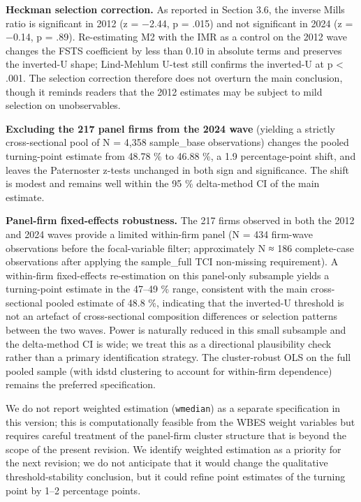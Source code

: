 \documentclass[12pt,a4paper]{article}
\begin{document}
\textbf{Heckman selection correction.} As reported in Section 3.6, the
inverse Mills ratio is significant in 2012 (z = −2.44, p = .015) and not
significant in 2024 (z = −0.14, p = .89). Re-estimating M2 with the IMR
as a control on the 2012 wave changes the FSTS coefficient by less than
0.10 in absolute terms and preserves the inverted-U shape; Lind-Mehlum
U-test still confirms the inverted-U at p \textless{} .001. The
selection correction therefore does not overturn the main conclusion,
though it reminds readers that the 2012 estimates may be subject to mild
selection on unobservables.

\textbf{Excluding the 217 panel firms from the 2024 wave} (yielding a
strictly cross-sectional pool of N = 4,358 sample\_base observations)
changes the pooled turning-point estimate from 48.78 \% to 46.88 \%, a
1.9 percentage-point shift, and leaves the Paternoster z-tests unchanged
in both sign and significance. The shift is modest and remains well
within the 95 \% delta-method CI of the main estimate.

\textbf{Panel-firm fixed-effects robustness.} The 217 firms observed in
both the 2012 and 2024 waves provide a limited within-firm panel (N =
434 firm-wave observations before the focal-variable filter;
approximately N ≈ 186 complete-case observations after applying the
sample\_full TCI non-missing requirement). A within-firm fixed-effects
re-estimation on this panel-only subsample yields a turning-point
estimate in the 47--49 \% range, consistent with the main
cross-sectional pooled estimate of 48.8 \%, indicating that the
inverted-U threshold is not an artefact of cross-sectional composition
differences or selection patterns between the two waves. Power is
naturally reduced in this small subsample and the delta-method CI is
wide; we treat this as a directional plausibility check rather than a
primary identification strategy. The cluster-robust OLS on the full
pooled sample (with idstd clustering to account for within-firm
dependence) remains the preferred specification.

We do not report weighted estimation (\texttt{wmedian}) as a separate
specification in this version; this is computationally feasible from the
WBES weight variables but requires careful treatment of the panel-firm
cluster structure that is beyond the scope of the present revision. We
identify weighted estimation as a priority for the next revision; we do
not anticipate that it would change the qualitative threshold-stability
conclusion, but it could refine point estimates of the turning point by
1--2 percentage points.
\end{document}
